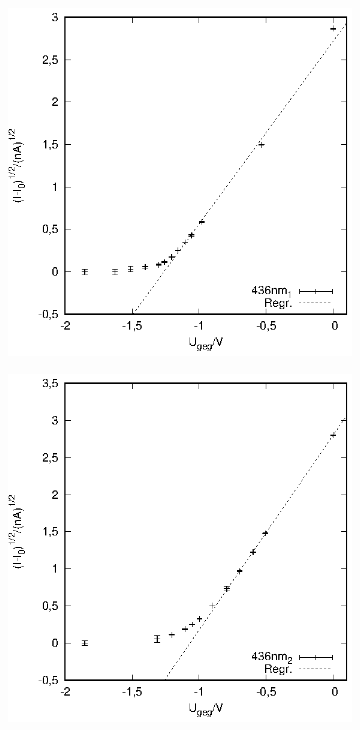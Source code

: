 \newpage
\vfill

\begin{figure}[hbt]
   \begin{subfigure}[h]{0.5\textwidth}
    \centering
    \includegraphics{data/Messung_photoeffekt/436nm_1.eps}
  \end{subfigure}%
  \begin{subfigure}[h]{0.5\textwidth}
    \centering
    \includegraphics{data/Messung_photoeffekt/436nm_2.eps}

\end{subfigure}
\end{figure}
